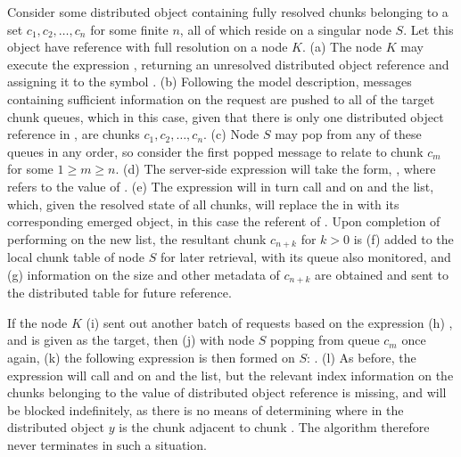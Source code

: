 Consider some distributed object containing fully resolved chunks belonging to
a set \({c_1, c_2, \dots, c_n}\) for some finite \(n\), all of which reside on
a singular node \(S\).
Let this object have reference  with full resolution on a node \(K\).
(\textcolor{dark2-1}{a}) The node \(K\) may execute the expression 
, returning an
unresolved distributed object reference and assigning it to the symbol
.
(\textcolor{dark2-1}{b}) Following the model description, messages containing sufficient information on
the request are pushed to all of the target chunk queues, which in this case,
given that there is only one distributed object reference in , are
chunks \(c_1, c_2, \dots, c_n\).
(\textcolor{dark2-1}{c}) Node \(S\) may pop from any of these queues in any order, so consider the first
popped message to relate to chunk \(c_m\) for some \(1 \geq m \geq n\).
(\textcolor{dark2-1}{d}) The server-side expression will take the form, 
,
where  refers to the value of .
(\textcolor{dark2-1}{e}) The expression will in turn call  and
 on  and the  list,
which, given the resolved state of all chunks, will replace the
 in  with its corresponding emerged
object, in this case the referent of .
Upon completion of performing  on the new  list, the
resultant chunk \(c_{n+k}\) for \(k > 0 \) is (\textcolor{dark2-1}{f}) added to the local chunk table
of node \(S\) for later retrieval, with its queue also monitored, and (\textcolor{dark2-1}{g})
information on the size and other metadata of \(c_{n+k}\) are obtained and sent
to the distributed table for future reference.

 If the node \(K\) (\textcolor{dark2-2}{i}) sent out another batch of requests
 based on the expression (\textcolor{dark2-2}{h})
, and
 is given as the target, then (\textcolor{dark2-2}{j}) with node \(S\) popping from queue
\(c_m\) once again, (\textcolor{dark2-2}{k}) the following expression is then formed on \(S\):
.
(\textcolor{dark2-2}{l}) As before, the expression will call  and
 on  and the  list,
but the relevant index information on the chunks belonging to the value of
distributed object reference  is missing, and will be blocked
indefinitely, as there is no means of determining where in the distributed
object \(y\) is the chunk adjacent to chunk .
The algorithm therefore never terminates in such a situation.

